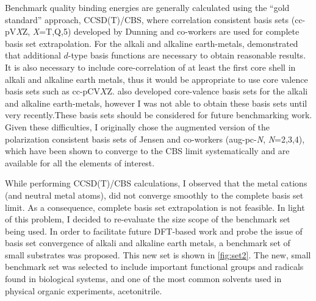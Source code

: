 Benchmark quality binding energies are generally calculated using the ``gold
standard'' approach, CCSD(T)/CBS, where correlation consistent basis
sets\cite{Marshall2011, Rezac2013} (cc-pV\emph{X}Z, \emph{X}=T,Q,5) developed by
Dunning and\cite{Vydrov2006, Vydrov2006a} co-workers are used for complete basis
set extrapolation. For the alkali and alkaline earth-metals, \citet{Iron2003}
demonstrated that additional $d$-type basis functions are necessary to obtain
reasonable results. It is also necessary to include core-correlation of at least
the first core shell in alkali and alkaline earth metals, thus it would be
appropriate to use core valence basis sets such as
cc-pCV$X$Z.\cite{Peterson2002} \citet{Iron2003} also developed core-valence
basis sets for the alkali and alkaline earth-metals, however I was not able to
obtain these basis sets until very recently.\footnotemark These basis sets
should be considered for future benchmarking work. Given these difficulties, I
originally chose the augmented version of the polarization consistent basis sets
of Jensen and co-workers\cite{Jensen2001, Jensen2002, Jensen2002a, Jensen2003}
(aug-pc-\emph{N}, \emph{N}=2,3,4), which have been shown to converge to the CBS
limit systematically\cite{Kupka2007} and are available for all the elements of
interest.


While performing CCSD(T)/CBS calculations, I observed that the metal cations
(and neutral metal atoms), did not converge smoothly to the complete basis set
limit. As a consequence, complete basis set extrapolation is not feasible. In
light of this problem, I decided to re-evaluate the size scope of the benchmark
set being used. In order to facilitate future DFT-based work and probe the issue
of basis set convergence of alkali and alkaline earth metals, a benchmark set of
small substrates was proposed. This new set is shown in \ref{fig:set2}. The new,
small benchmark set was selected to include important functional groups and
radicals found in biological systems, and one of the most common solvents used
in physical organic experiments, acetonitrile.

